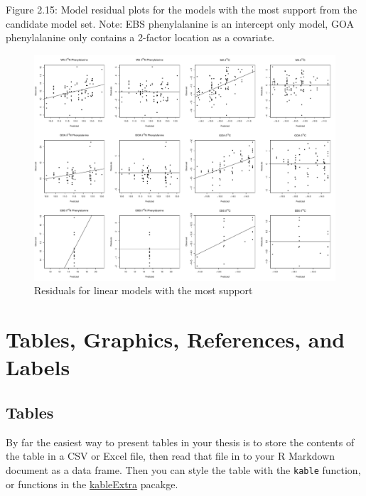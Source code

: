 \documentclass [11pt, proquest] {uwthesis}[2015/03/03]
\begin{document}
Figure 2.15: Model residual plots for the models with the most support
from the candidate model set. Note: EBS phenylalanine is an intercept
only model, GOA phenylalanine only contains a 2-factor location as a
covariate. \newline 
\begin{figure}[h]
\centering
  \includegraphics[height=0.8\textwidth]{figure/Ch2/FigureS8.pdf}
  \caption{Residuals for linear models with the most support}
  \label{fig:linresid2}
\end{figure}
\hypertarget{ref-labels}{\chapter{Tables, Graphics, References, and
Labels}\label{ref-labels}}

\hypertarget{tables}{\section{Tables}\label{tables}}

By far the easiest way to present tables in your thesis is to store the
contents of the table in a CSV or Excel file, then read that file in to
your R Markdown document as a data frame. Then you can style the table
with the \texttt{kable} function, or functions in the
\href{https://cran.r-project.org/web/packages/kableExtra/index.html}{kableExtra}
pacakge.
\end{document}
